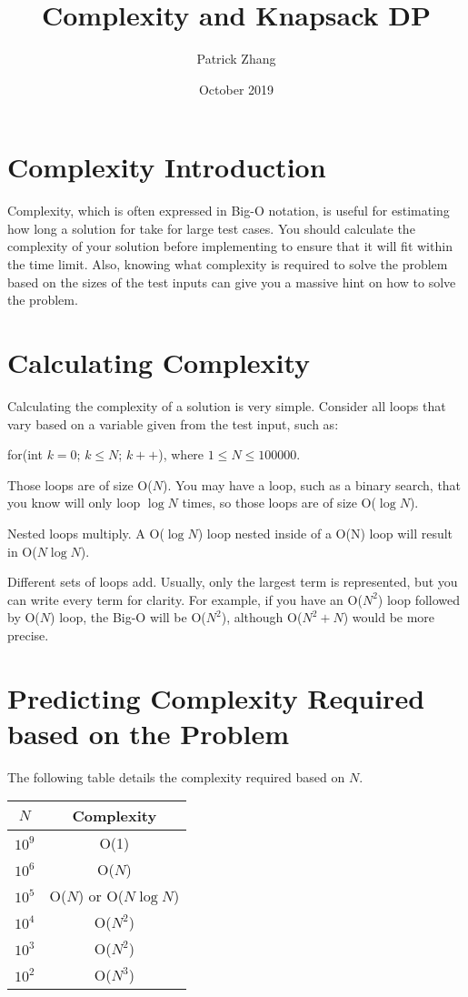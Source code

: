 \documentclass{article}
\title{Complexity and Knapsack DP}
\author{Patrick Zhang}
\date{October 2019}
\begin{document}
\maketitle

\section{Complexity Introduction}
Complexity, which is often expressed in Big-O notation, is useful for estimating how long a solution for take for large test cases. You should calculate the complexity of your solution before implementing to ensure that it will fit within the time limit. Also, knowing what complexity is required to solve the problem based on the sizes of the test inputs can give you a massive hint on how to solve the problem.

\section{Calculating Complexity}
Calculating the complexity of a solution is very simple. Consider all loops that vary based on a variable given from the test input, such as:

for(int $k = 0$; $k \leq N$; $k++$), where $1\leq N \leq 100000.$

Those loops are of size O($N$). You may have a loop, such as a binary search, that you know will only loop $\log{N}$ times, so those loops are of size O($\log{N}$).

Nested loops multiply. A O($\log{N}$) loop nested inside of a O(N) loop will result in O($N\log{N}$).

Different sets of loops add. Usually, only the largest term is represented, but you can write every term for clarity. For example, if you have an O($N^{2}$) loop followed by O($N$) loop, the Big-O will be O($N^{2}$), although O($N^{2} + N$) would be more precise.

\section{Predicting Complexity Required based on the Problem}
The following table details the complexity required based on $N.$

\begin{center}
    \begin{tabular}{||c|c||}
    \hline
       $N$  &  Complexity\\
      \hline\hline
        $10^9$ & O(1) \\
        \hline
        $10^6$ & O($N$) \\
        \hline
        $10^5$ & O($N$) or O($N\log{N}$)\\
        \hline
        $10^4$ & O($N^2$) \\
        \hline
        $10^3$ & O($N^2$) \\
        \hline
        $10^2$ & O($N^3$) \\
        \hline
    \end{tabular}
\end{center}
\end{document}
